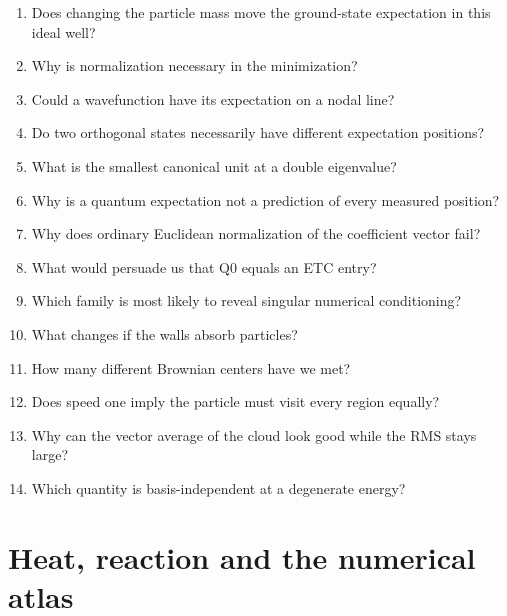\documentclass[11pt,oneside,openany]{book}
\begin{document}
\begin{enumerate}

\item\label{ex:47} Does changing the particle mass move the ground-state expectation in this ideal well?

\item\label{ex:48} Why is normalization necessary in the minimization?

\item\label{ex:49} Could a wavefunction have its expectation on a nodal line?

\item\label{ex:50} Do two orthogonal states necessarily have different expectation positions?

\item\label{ex:51} What is the smallest canonical unit at a double eigenvalue?

\item\label{ex:52} Why is a quantum expectation not a prediction of every measured position?

\item\label{ex:53} Why does ordinary Euclidean normalization of the coefficient vector fail?

\item\label{ex:54} What would persuade us that $\mathrm{Q0}$ equals an ETC entry?

\item\label{ex:55} Which family is most likely to reveal singular numerical conditioning?

\item\label{ex:56} What changes if the walls absorb particles?

\item\label{ex:57} How many different Brownian centers have we met?

\item\label{ex:58} Does speed one imply the particle must visit every region equally?

\item\label{ex:59} Why can the vector average of the cloud look good while the RMS stays large?

\item\label{ex:60} Which quantity is basis-independent at a degenerate energy?

\end{enumerate}

\chapter{Heat, reaction and the numerical atlas}\label{ch:5}
\end{document}
